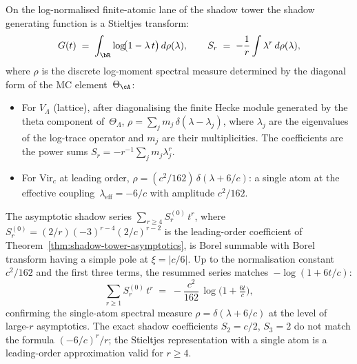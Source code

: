 \begin{theorem}
\label{thm:shadow-spectral-measure}
\label{thm:shadow-gf-borel}
\ClaimStatusProvedHere
On the log-normalised finite-atomic lane of the shadow tower the
shadow generating function is a Stieltjes transform:
\begin{equation}\label{eq:stieltjes-representation}
 G(t) \;=\; \int_{\bR} \log\!\bigl(1 - \lambda\,t\bigr)\,d\rho(\lambda),
 \qquad
 S_r \;=\; -\frac{1}{r}\int \lambda^r\,d\rho(\lambda),
\end{equation}
where $\rho$ is the discrete log-moment spectral measure determined by
the diagonal form of the MC element~$\Theta_\cA$:
\begin{itemize}[nosep]
\item For $V_\Lambda$ \textup{(}lattice\textup{)}, after diagonalising the
 finite Hecke module generated by the theta component of~$\Theta_\Lambda$,
 $\rho = \sum_j m_j\,\delta(\lambda - \lambda_j)$, where
 $\lambda_j$ are the eigenvalues of the log-trace operator and $m_j$
 are their multiplicities. The coefficients are the power sums
 $S_r = -r^{-1}\sum_j m_j\lambda_j^r$.
\item For $\mathrm{Vir}_c$ at leading order,
 $\rho = (c^2/162)\,\delta(\lambda + 6/c)$: a single atom at the
 effective coupling~$\lambda_{\mathrm{eff}} = -6/c$ with amplitude
 $c^2/162$.
\end{itemize}
The asymptotic shadow series
$\sum_{r\ge4} S_r^{(0)}\,t^r$, where
$S_r^{(0)} = (2/r)(-3)^{r-4}(2/c)^{r-2}$ is the leading-order
coefficient of
Theorem~\textup{\ref{thm:shadow-tower-asymptotics}},
is Borel summable with
Borel transform having a simple pole at $\xi = |c/6|$.
Up to the normalisation constant $c^2/162$ and the
first three terms, the resummed series matches~$-\log(1 + 6t/c)$:
\[
 \sum_{r\ge1} S_r^{(0)}\,t^r
 \;=\; -\frac{c^2}{162}\,\log\!\bigl(1 + \tfrac{6t}{c}\bigr),
\]
confirming the single-atom spectral measure
$\rho = \delta(\lambda + 6/c)$ at the level of
large-$r$ asymptotics. The exact shadow coefficients
$S_2 = c/2$, $S_3 = 2$ do not match the
formula $(-6/c)^r/r$; the Stieltjes
representation with a single atom is a leading-order
approximation valid for $r \ge 4$.
\end{theorem}

